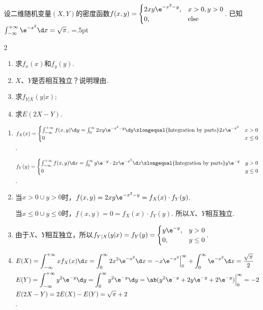\begin{problem}
    设二维随机变量$(X,Y)$的密度函数$f(x,y)=\begin{cases}
        2xy\e^{-x^2-y}, &x>0,y>0\\
        0, &\text{else}
    \end{cases}$. 已知$\int_{-\infty}^{+\infty}\e^{-x^2}\d x=\sqrt\pi$.
\columnseprule=.5pt
\begin{multicols}{2}
\begin{enumerate}
    \item 求$f_x(x)$和$f_y(y)$.
    \item $X$、$Y$是否相互独立？说明理由.
    \item 求$f_{Y|X}(y|x)$;
    \item 求$E(2X-Y)$.
\end{enumerate}
\end{multicols}
\end{problem}
\begin{solution}
\begin{enumerate}
    \item $f_X(x)=\begin{cases}
        \int_{-\infty}^{+\infty}f(x,y)\d y=\int_0^\infty2xy\e^{-x^2-y}\d y\xlongequal{\text{Integration by parts}}2x\e^{-x^2} & x>0\\
        0 & x\leq 0
    \end{cases}$.

    $f_Y(y)=\begin{cases}
        \int_{-\infty}^{+\infty}f(x,y)\d x=\int_0^\infty y\e^{-y}\cdot2x\e^{-x^2}\d x\xlongequal{\text{Integration by parts}}y\e^{-y} & y>0\\
        0 & y\leq 0
    \end{cases}$.
    \item 当$x>0\cup y>0$时，$f(x,y)=2xy\e^{-x^2-y}=f_X(x)\cdot f_Y(y)$.
    
    当$x\leq 0\cup y\leq 0$时，$f(x,y)=0=f_X(x)\cdot f_Y(y)$. 所以$X$、$Y$相互独立.
    \item 由于$X$、$Y$相互独立，所以$f_{Y|X}(y|x)=f_Y(y)=\begin{cases}
        y\e^{-y}, & y>0\\
        0, & y\leq 0
    \end{cases}$.
    \item $\begin{aligned}[t]
        &E(X)=\int_{-\infty}^{+\infty}xf_X(x)\d x=\int_0^\infty2x^2\e^{-x^2}\d x=-x\e^{-x^2}\Big|_0^\infty+\int_0^\infty\e^{-x^2}\d x=\frac{\sqrt\pi}{2}\\
        &E(Y)=\int_{-\infty}^{+\infty}y^2\e^{-y}\d y=\int_0^\infty y^2\e^{-y}\d y=\ab(y^2\e^{-y}+2y\e^{-y}+2\e^{-y})\Big|_0^\infty=-2\\
        &E(2X-Y)=2E(X)-E(Y)=\sqrt\pi+2
    \end{aligned}$.
\end{enumerate}
\end{solution}

